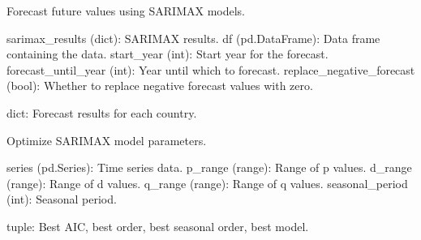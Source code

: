 \documentclass[letterpaper,10pt,english]{sphinxmanual}
\begin{document}
\begin{fulllineitems}
\label{\detokenize{Sarimax:Sarimax.forecast_future}}
\pysigstartsignatures
{}
\pysigstopsignatures
\sphinxAtStartPar
Forecast future values using SARIMAX models.
\begin{description}
\sphinxAtStartPar
sarimax\_results (dict): SARIMAX results.
df (pd.DataFrame): Data frame containing the data.
start\_year (int): Start year for the forecast.
forecast\_until\_year (int): Year until which to forecast.
replace\_negative\_forecast (bool): Whether to replace negative forecast values with zero.

\sphinxAtStartPar
dict: Forecast results for each country.

\end{description}

\end{fulllineitems}


\begin{fulllineitems}
\label{\detokenize{Sarimax:Sarimax.optimize_sarimax}}
\pysigstartsignatures
{}
\pysigstopsignatures
\sphinxAtStartPar
Optimize SARIMAX model parameters.
\begin{description}
\sphinxAtStartPar
series (pd.Series): Time series data.
p\_range (range): Range of p values.
d\_range (range): Range of d values.
q\_range (range): Range of q values.
seasonal\_period (int): Seasonal period.

\sphinxAtStartPar
tuple: Best AIC, best order, best seasonal order, best model.

\end{description}

\end{fulllineitems}
\end{document}
